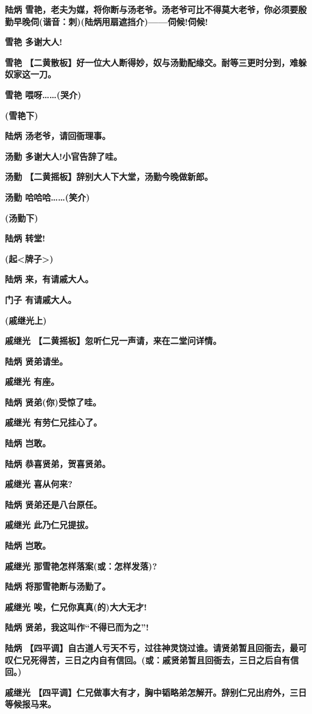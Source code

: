 \textbf{陆炳
雪艳，老夫为媒，将你断与汤老爷。汤老爷可比不得莫大老爷，你必须要殷勤早晚伺(谐音：刺)(陆炳用扇遮挡介)------伺候!伺候!}

\textbf{雪艳 多谢大人!}

\textbf{雪艳
【二黄散板】好一位大人断得妙，奴与汤勤配缘交。耐等三更时分到，难躲奴家这一刀。}

\textbf{雪艳 喂呀\ldots{}\ldots{}(哭介)}

\textbf{(雪艳下)}

\textbf{陆炳 汤老爷，请回衙理事。}

\textbf{汤勤 多谢大人!小官告辞了哇。}

\textbf{汤勤 【二黄摇板】辞别大人下大堂，汤勤今晚做新郎。}

\textbf{汤勤 哈哈哈\ldots{}\ldots{}(笑介)}

\textbf{(汤勤下)}

\textbf{陆炳 转堂!}

\textbf{(起\textless{}牌子\textgreater{})}

\textbf{陆炳 来，有请戚大人。}

\textbf{门子 有请戚大人。}

\textbf{(戚继光上)}

\textbf{戚继光 【二黄摇板】忽听仁兄一声请，来在二堂问详情。}

\textbf{陆炳 贤弟请坐。}

\textbf{戚继光 有座。}

\textbf{陆炳 贤弟(你)受惊了哇。}

\textbf{戚继光 有劳仁兄挂心了。}

\textbf{陆炳 岂敢。}

\textbf{陆炳 恭喜贤弟，贺喜贤弟。}

\textbf{戚继光 喜从何来?}

\textbf{陆炳 贤弟还是八台原任。}

\textbf{戚继光 此乃仁兄提拔。}

\textbf{陆炳 岂敢。}

\textbf{戚继光 那雪艳怎样落案(或：怎样发落)?}

\textbf{陆炳 将那雪艳断与汤勤了。}

\textbf{戚继光 唉，仁兄你真真(的)大大无才!}

\textbf{陆炳 贤弟，我这叫作``不得已而为之''!}

\textbf{陆炳
【四平调】自古道人亏天不亏，过往神灵饶过谁。请贤弟暂且回衙去，最可叹仁兄死得苦，三日之内自有信回。(或：戚贤弟暂且回衙去，三日之后自有信回。)}

\textbf{戚继光
【四平调】仁兄做事大有才，胸中韬略弟怎解开。辞别仁兄出府外，三日等候报马来。}

